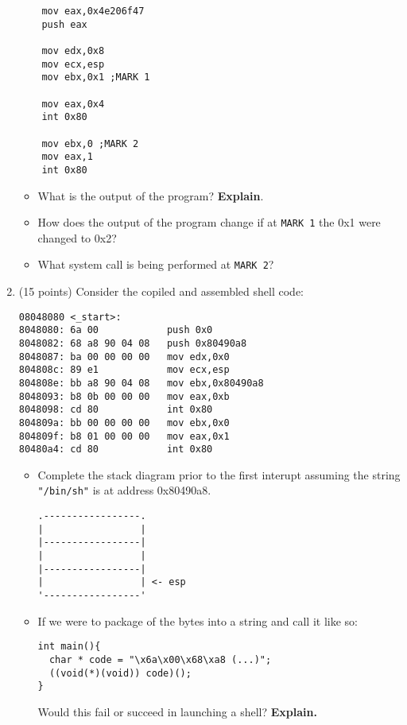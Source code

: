 \documentclass{article}[9pt]
\begin{document}
\begin{enumerate}
\begin{verbatim}
    mov eax,0x4e206f47
    push eax 

    mov edx,0x8
    mov ecx,esp
    mov ebx,0x1 ;MARK 1

    mov eax,0x4
    int 0x80 

    mov ebx,0 ;MARK 2
    mov eax,1
    int 0x80
\end{verbatim}
\begin{itemize}
\item What is the output of the program? \textbf{Explain}.

\item How does the output of the program change if at \texttt{MARK 1} the 0x1
were changed to 0x2?

\item What system call is being performed at \texttt{MARK 2}?
\end{itemize}

\item (15 points) Consider the copiled and assembled shell code:

\begin{verbatim}
08048080 <_start>:
8048080: 6a 00            push 0x0
8048082: 68 a8 90 04 08   push 0x80490a8
8048087: ba 00 00 00 00   mov edx,0x0
804808c: 89 e1            mov ecx,esp
804808e: bb a8 90 04 08   mov ebx,0x80490a8
8048093: b8 0b 00 00 00   mov eax,0xb
8048098: cd 80            int 0x80
804809a: bb 00 00 00 00   mov ebx,0x0
804809f: b8 01 00 00 00   mov eax,0x1
80480a4: cd 80            int 0x80
\end{verbatim}

\begin{itemize}
\item Complete the stack diagram prior to the first interupt assuming
the string \texttt{"/bin/sh"} is at address 0x80490a8. 

\begin{verbatim}
.-----------------.
|                 |
|-----------------|
|                 |
|-----------------|
|                 | <- esp
'-----------------'
\end{verbatim}

\item If we were to package of the bytes into a string and call it
like so:

\begin{verbatim}
int main(){
  char * code = "\x6a\x00\x68\xa8 (...)";
  ((void(*)(void)) code)();
}
\end{verbatim}

Would this fail or succeed in launching a shell? \textbf{Explain.}


\end{itemize}
\end{enumerate}
\end{document}
